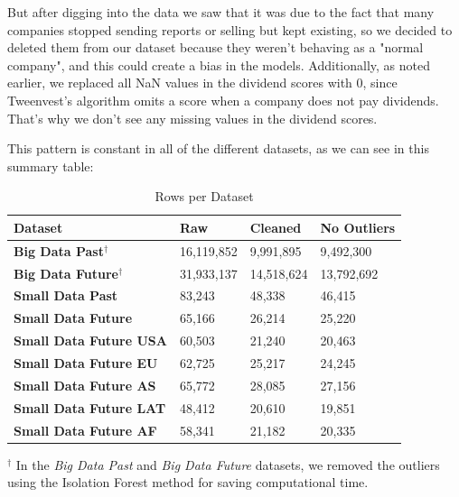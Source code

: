 \documentclass[11pt,english,a4paper,hidelinks]{book}
\begin{document}
\noindent   But after digging into the data we saw that it was due to the fact that many companies stopped sending reports or selling but kept existing, so we decided to deleted them from our dataset because they weren't behaving as a "normal company", and this could create a bias in the models. Additionally, as noted earlier, we replaced all NaN values in the dividend scores with 0, since Tweenvest's algorithm omits a score when a company does not pay dividends. That's why we don't see any missing values in the dividend scores.

\vspace{0.5cm}
\noindent This pattern is constant in all of the different datasets, as we can see in this summary table:

\begin{table}[H]
    \centering
    \begin{tabular}{|l|l|l|l|}
        \hline  
        \textbf{Dataset} & \textbf{Raw} & \textbf{Cleaned} & \textbf{No Outliers} \\
        \hline
        \textbf{Big Data Past$^\dagger$} & 16,119,852 & 9,991,895 & 9,492,300 \\
        \hline
        \textbf{Big Data Future$^\dagger$} & 31,933,137 & 14,518,624 & 13,792,692 \\
        \hline 
        \textbf{Small Data Past} & 83,243 & 48,338 & 46,415 \\
        \hline
        \textbf{Small Data Future} & 65,166 & 26,214 & 25,220 \\
        \hline
        \textbf{Small Data Future USA} & 60,503 & 21,240 & 20,463 \\
        \hline
        \textbf{Small Data Future EU} & 62,725 & 25,217 & 24,245 \\
        \hline        
        \textbf{Small Data Future AS} & 65,772 & 28,085 & 27,156\\
        \hline
        \textbf{Small Data Future LAT} & 48,412 & 20,610 & 19,851 \\
        \hline
        \textbf{Small Data Future AF} & 58,341 & 21,182 & 20,335 \\
        \hline
        \end{tabular}

    \caption{Rows per Dataset}
    \label{tab:datasets_summary}
\end{table}

\noindent $^\dagger$ In the \textit{Big Data Past} and \textit{Big Data Future} datasets, we removed the outliers using the Isolation Forest method for saving computational time.
\end{document}
